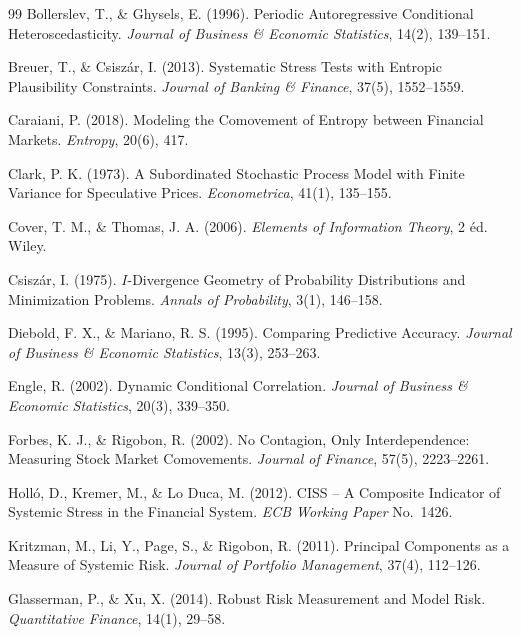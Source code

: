 \begin{thebibliography}{99}
 Bollerslev, T., \& Ghysels, E. (1996). Periodic Autoregressive Conditional Heteroscedasticity. \textit{Journal of Business \& Economic Statistics}, 14(2), 139--151.

 Breuer, T., \& Csiszár, I. (2013). Systematic Stress Tests with Entropic Plausibility Constraints. \textit{Journal of Banking \& Finance}, 37(5), 1552--1559.

 Caraiani, P. (2018). Modeling the Comovement of Entropy between Financial Markets. \textit{Entropy}, 20(6), 417.

 Clark, P. K. (1973). A Subordinated Stochastic Process Model with Finite Variance for Speculative Prices. \textit{Econometrica}, 41(1), 135--155.

 Cover, T. M., \& Thomas, J. A. (2006). \textit{Elements of Information Theory}, 2\ieme{} éd. Wiley.

 Csiszár, I. (1975). $I$-Divergence Geometry of Probability Distributions and Minimization Problems. \textit{Annals of Probability}, 3(1), 146--158.

 Diebold, F. X., \& Mariano, R. S. (1995). Comparing Predictive Accuracy. \textit{Journal of Business \& Economic Statistics}, 13(3), 253--263.

 Engle, R. (2002). Dynamic Conditional Correlation. \textit{Journal of Business \& Economic Statistics}, 20(3), 339--350.

 Forbes, K. J., \& Rigobon, R. (2002). No Contagion, Only Interdependence: Measuring Stock Market Comovements. \textit{Journal of Finance}, 57(5), 2223--2261.

 Holló, D., Kremer, M., \& Lo Duca, M. (2012). CISS -- A Composite Indicator of Systemic Stress in the Financial System. \textit{ECB Working Paper} No.~1426.

 Kritzman, M., Li, Y., Page, S., \& Rigobon, R. (2011). Principal Components as a Measure of Systemic Risk. \textit{Journal of Portfolio Management}, 37(4), 112--126.

 Glasserman, P., \& Xu, X. (2014). Robust Risk Measurement and Model Risk. \textit{Quantitative Finance}, 14(1), 29--58.


\end{thebibliography}
